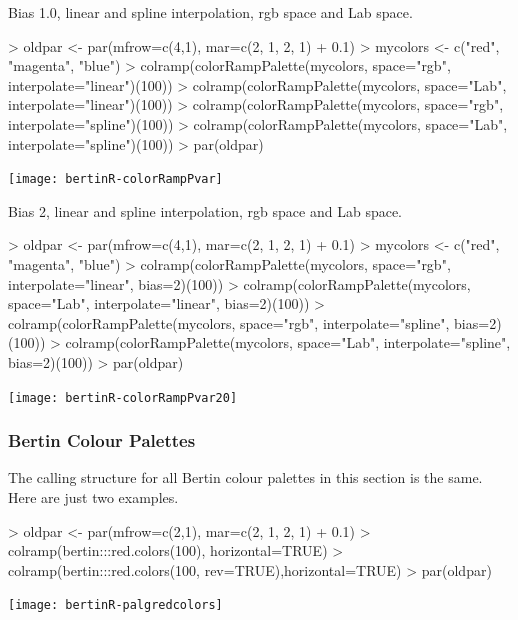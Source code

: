 \documentclass[nogin, dvips,12pt,a4paper,twoside]{amsart}
\begin{document}
\clearpage
Bias 1.0, linear and spline interpolation, rgb space and Lab space.
\bigskip

\begin{Schunk}
\begin{Sinput}
> oldpar <- par(mfrow=c(4,1), mar=c(2, 1, 2, 1) + 0.1)
> mycolors <- c("red", "magenta", "blue")
> colramp(colorRampPalette(mycolors, space="rgb", interpolate="linear")(100))
> colramp(colorRampPalette(mycolors, space="Lab", interpolate="linear")(100))
> colramp(colorRampPalette(mycolors, space="rgb", interpolate="spline")(100))
> colramp(colorRampPalette(mycolors, space="Lab", interpolate="spline")(100))
> par(oldpar)
\end{Sinput}
\end{Schunk}
\texttt{[image: bertinR-colorRampPvar]}

\clearpage
Bias 2, linear and spline interpolation, rgb space and Lab space.
\bigskip

\begin{Schunk}
\begin{Sinput}
> oldpar <- par(mfrow=c(4,1), mar=c(2, 1, 2, 1) + 0.1)
> mycolors <- c("red", "magenta", "blue")
> colramp(colorRampPalette(mycolors, space="rgb", interpolate="linear", bias=2)(100))
> colramp(colorRampPalette(mycolors, space="Lab", interpolate="linear", bias=2)(100))
> colramp(colorRampPalette(mycolors, space="rgb", interpolate="spline", bias=2)(100))
> colramp(colorRampPalette(mycolors, space="Lab", interpolate="spline", bias=2)(100))
> par(oldpar)
\end{Sinput}
\end{Schunk}
\texttt{[image: bertinR-colorRampPvar20]}

\clearpage
\subsubsection{Bertin Colour Palettes}
The calling structure for all Bertin colour palettes in this section is the same.
Here are just two examples.

\begin{Schunk}
\begin{Sinput}
> oldpar <- par(mfrow=c(2,1), mar=c(2, 1, 2, 1) + 0.1)
> colramp(bertin:::red.colors(100), horizontal=TRUE)
> colramp(bertin:::red.colors(100, rev=TRUE),horizontal=TRUE)
> par(oldpar)
\end{Sinput}
\end{Schunk}
\texttt{[image: bertinR-palgredcolors]}
\end{document}
